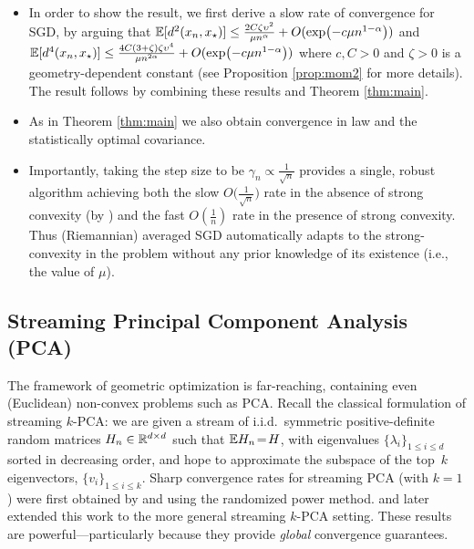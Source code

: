 \begin{itemize}
\vspace*{-6pt}
  \item In order to show the result, we first derive a
  slow rate of convergence for SGD,
 by arguing that $\mathbb{E}[d^2(x_{n},x_\star)]\leq \frac{2C  \zeta \upsilon^2}{\mu n^\alpha } + O( \exp(-c\mu n^{1-\alpha} ))$ and $
  \mathbb{E}[d^4(x_{n},x_\star)]\leq\frac{4C(3+\zeta)\zeta\upsilon^4}{\mu n^{2\alpha} } + O( \exp(-c\mu n^{1-\alpha} ))$ where $c, C> 0$ and $\zeta > 0$ is a geometry-dependent constant (see Proposition \ref{prop:mom2} for more details). The result follows by combining these results and Theorem \ref{thm:main}.
  \item  \vspace*{-6pt}
 As in Theorem \ref{thm:main} we also obtain convergence in law and the statistically optimal covariance.
  \vspace*{-6pt}
  \item Importantly, taking the step size to be $\gamma_n \propto \frac{1}{\sqrt{n}}$ provides a single, robust algorithm achieving both the slow $O\big(\frac{1}{\sqrt{n}}\big)$ rate in the absence of strong convexity (by \citet{zhang2016first}) and the fast $O(\frac{1}{n})$ rate in the presence of strong convexity. Thus (Riemannian) averaged SGD automatically adapts to the strong-convexity in the problem without any prior knowledge of its existence (i.e., the value of $\mu$).
  \vspace*{-6pt}
\end{itemize}
\vspace{-9pt}
\subsection{Streaming Principal Component Analysis (PCA)} \label{sec:stream_pca}
\vspace{-.0856cm}
The framework of geometric optimization is far-reaching, containing even (Euclidean) non-convex problems such as PCA. Recall the classical formulation of streaming $k$-PCA: we are given a stream of i.i.d.~symmetric positive-definite random matrices $H_n \in \mathbb{R}^{d \times d}$ such that $\mathbb{E} H_n\!=\!H$, with eigenvalues $\{ \lambda_i \}_{1 \leq i \leq d}$ sorted in decreasing order, and hope to approximate the subspace of the top~$k$ eigenvectors, $\{ v_i \}_{1 \leq i \leq k}$. Sharp convergence rates for streaming PCA (with $k\!=\!1$) were first obtained by \citet{jain2016streaming} and \citet{shamir16b} using the randomized power method.
\citet{shamir2016fast} and \citet{AllenLi2017-streampca}
  later extended this work to the more general streaming $k$-PCA setting. These results are powerful---particularly because they provide \textit{global} convergence guarantees.

